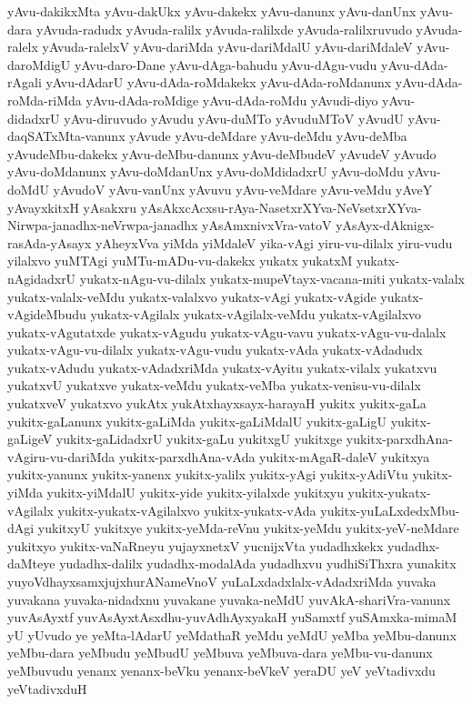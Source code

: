 {yAvu-dakikxMta
yAvu-dakUkx
yAvu-dakekx
yAvu-danunx
yAvu-danUnx
yAvu-dara
yAvuda-radudx
yAvuda-ralilx
yAvuda-ralilxde
yAvuda-ralilxruvudo
yAvuda-ralelx
yAvuda-ralelxV
yAvu-dariMda
yAvu-dariMdalU
yAvu-dariMdaleV
yAvu-daroMdigU
yAvu-daro-Dane
yAvu-dAga-bahudu
yAvu-dAgu-vudu
yAvu-dAda-rAgali
yAvu-dAdarU
yAvu-dAda-roMdakekx
yAvu-dAda-roMdanunx
yAvu-dAda-roMda-riMda
yAvu-dAda-roMdige
yAvu-dAda-roMdu
yAvudi-diyo
yAvu-didadxrU
yAvu-diruvudo
yAvudu
yAvu-duMTo
yAvuduMToV
yAvudU
yAvu-daqSATxMta-vanunx
yAvude
yAvu-deMdare
yAvu-deMdu
yAvu-deMba
yAvudeMbu-dakekx
yAvu-deMbu-danunx
yAvu-deMbudeV
yAvudeV
yAvudo
yAvu-doMdanunx
yAvu-doMdanUnx
yAvu-doMdidadxrU
yAvu-doMdu
yAvu-doMdU
yAvudoV
yAvu-vanUnx
yAvuvu
yAvu-veMdare
yAvu-veMdu
yAveY
yAvayxkitxH
yAsakxru
yAsAkxcAcxsu-rAya-NasetxrXYva-NeVsetxrXYva-Nirwpa-janadhx-neVrwpa-janadhx
yAsAmxnivxVra-vatoV
yAsAyx-dAknigx-rasAda-yAsayx
yAheyxVva
yiMda
yiMdaleV
yika-vAgi
yiru-vu-dilalx
yiru-vudu
yilalxvo
yuMTAgi
yuMTu-mADu-vu-dakekx
yukatx
yukatxM
yukatx-nAgidadxrU
yukatx-nAgu-vu-dilalx
yukatx-mupeVtayx-vacana-miti
yukatx-valalx
yukatx-valalx-veMdu
yukatx-valalxvo
yukatx-vAgi
yukatx-vAgide
yukatx-vAgideMbudu
yukatx-vAgilalx
yukatx-vAgilalx-veMdu
yukatx-vAgilalxvo
yukatx-vAgutatxde
yukatx-vAgudu
yukatx-vAgu-vavu
yukatx-vAgu-vu-dalalx
yukatx-vAgu-vu-dilalx
yukatx-vAgu-vudu
yukatx-vAda
yukatx-vAdadudx
yukatx-vAdudu
yukatx-vAdadxriMda
yukatx-vAyitu
yukatx-vilalx
yukatxvu
yukatxvU
yukatxve
yukatx-veMdu
yukatx-veMba
yukatx-venisu-vu-dilalx
yukatxveV
yukatxvo
yukAtx
yukAtxhayxsayx-harayaH
yukitx
yukitx-gaLa
yukitx-gaLanunx
yukitx-gaLiMda
yukitx-gaLiMdalU
yukitx-gaLigU
yukitx-gaLigeV
yukitx-gaLidadxrU
yukitx-gaLu
yukitxgU
yukitxge
yukitx-parxdhAna-vAgiru-vu-dariMda
yukitx-parxdhAna-vAda
yukitx-mAgaR-daleV
yukitxya
yukitx-yanunx
yukitx-yanenx
yukitx-yalilx
yukitx-yAgi
yukitx-yAdiVtu
yukitx-yiMda
yukitx-yiMdalU
yukitx-yide
yukitx-yilalxde
yukitxyu
yukitx-yukatx-vAgilalx
yukitx-yukatx-vAgilalxvo
yukitx-yukatx-vAda
yukitx-yuLaLxdedxMbu-dAgi
yukitxyU
yukitxye
yukitx-yeMda-reVnu
yukitx-yeMdu
yukitx-yeV-neMdare
yukitxyo
yukitx-vaNaRneyu
yujayxnetxV
yucnijxVta
yudadhxkekx
yudadhx-daMteye
yudadhx-dalilx
yudadhx-modalAda
yudadhxvu
yudhiSiThxra
yunakitx
yuyoVdhayxsamxjujxhurANameVnoV
yuLaLxdadxlalx-vAdadxriMda
yuvaka
yuvakana
yuvaka-nidadxnu
yuvakane
yuvaka-neMdU
yuvAkA-shariVra-vanunx
yuvAsAyxtf
yuvAsAyxtAsxdhu-yuvAdhAyxyakaH
yuSamxtf
yuSAmxka-mimaM
yU
yUvudo
ye
yeMta-lAdarU
yeMdathaR
yeMdu
yeMdU
yeMba
yeMbu-danunx
yeMbu-dara
yeMbudu
yeMbudU
yeMbuva
yeMbuva-dara
yeMbu-vu-danunx
yeMbuvudu
yenanx
yenanx-beVku
yenanx-beVkeV
yeraDU
yeV
yeVtadivxdu
yeVtadivxduH
}
